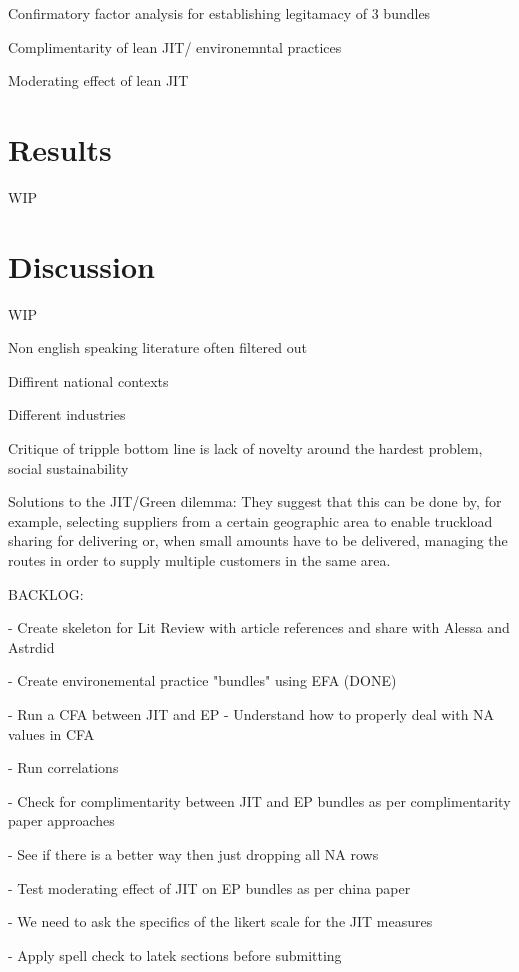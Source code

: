 \documentclass[]{article}
\begin{document}
Confirmatory factor analysis for establishing legitamacy of 3 bundles

Complimentarity of lean JIT/ environemntal practices

Moderating effect of lean JIT 



\section{Results}
WIP

\section{Discussion}
WIP

Non english speaking literature often filtered out

Diffirent national contexts

Different industries

Critique of tripple bottom line is lack of novelty around the hardest problem, social sustainability

Solutions to the JIT/Green dilemma: They suggest that this can be done by, for example, selecting suppliers from a certain geographic area to enable truckload sharing for delivering or, when small amounts have to be delivered, managing the routes in order to supply multiple customers in the same area. 

BACKLOG:

- Create skeleton for Lit Review with article references and share with Alessa and Astrdid

- Create environemental practice "bundles" using EFA (DONE)

- Run a CFA between JIT and EP
 - Understand how to properly deal with NA values in CFA

- Run correlations

- Check for complimentarity between JIT and EP bundles as per complimentarity paper approaches

- See if there is a better way then just dropping all NA rows

- Test moderating effect of JIT on EP bundles as per china paper

- We need to ask the specifics of the likert scale for the JIT measures

- Apply spell check to latek sections before submitting

\end{document}
